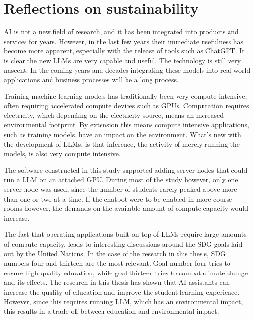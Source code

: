 \section{Reflections on sustainability}
\label{sec:reflections}




AI is not a new field of research, and it has been integrated into products and services for years. However, in the last few years their immediate usefulness has become more apparent, especially with the release of tools such as ChatGPT. It is clear the new \gls{LLM}s are very capable and useful. The technology is still very nascent. In the coming years and decades integrating these models into real world applications and business processes will be a long process.


Training machine learning models has traditionally been very compute-intensive, often requiring accelerated compute devices such as GPUs. Computation requires electricity, which depending on the electricity source, means an increased environmental footprint. By extension this means compute intensive applications, such as training models, have an impact on the environment. What’s new with the development of \gls{LLM}s, is that inference, the activity of merely running the models, is also very compute intensive.


The software constructed in this study supported adding server nodes that could run a \gls{LLM} on an attached GPU. During most of the study however, only one server node was used, since the number of students rarely peaked above more than one or two at a time. If the chatbot were to be enabled in more course rooms however, the demands on the available amount of compute-capacity would increase.


The fact that operating applications built on-top of \gls{LLM}s require large amounts of compute capacity, leads to interesting discussions around the \gls{SDG} goals laid out by the United Nations. In the case of the research in this thesis, \gls{SDG} numbers four and thirteen are the most relevant. Goal number four tries to ensure high quality education, while goal thirteen tries to combat climate change and its effects. The research in this thesis has shown that AI-assistants can increase the quality of education and improve the student learning experience. However, since this requires running \gls{LLM}, which has an environmental impact, this results in a trade-off between education and environmental impact.


